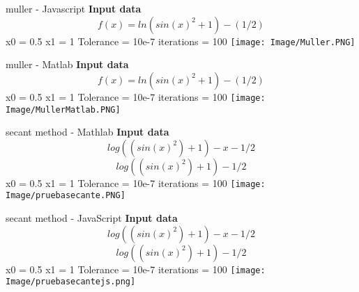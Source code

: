 \documentclass{article}
\begin{document}
\begin{section}{muller - Javascript}
   \textbf{Input data}\newline
   \[f(x)=ln(sin(x)^2+1)-(1/2)\]\newline
    x0 = 0.5\newline
    x1 = 1\newline
    Tolerance = 10e-7\newline
    iterations = 100 \newline\newline
    \texttt{[image: Image/Muller.PNG]}
\end{section}
\begin{section}{muller - Matlab}
   \textbf{Input data}\newline
    \[f(x)=ln(sin(x)^2+1)-(1/2)\]\newline
    x0 = 0.5\newline
    x1 = 1\newline
    Tolerance = 10e-7\newline
    iterations = 100 \newline\newline
    \texttt{[image: Image/MullerMatlab.PNG]}
\end{section}
\begin{section}{secant method - Mathlab}
   \textbf{Input data}\newline
    \[log((sin(x)^2)+1)-x-1/2\]\newline
    \[log((sin(x)^2)+1)-1/2\]\newline
    x0 = 0.5\newline
    x1 = 1\newline
    Tolerance = 10e-7\newline
    iterations = 100 \newline\newline
    \texttt{[image: Image/pruebasecante.PNG]}
\end{section}
\begin{section}{secant method - JavaScript}
   \textbf{Input data}\newline
    \[log((sin(x)^2)+1)-x-1/2\]\newline
    \[log((sin(x)^2)+1)-1/2\]\newline
    x0 = 0.5\newline
    x1 = 1\newline
    Tolerance = 10e-7\newline
    iterations = 100 \newline\newline
    \texttt{[image: Image/pruebasecantejs.png]}
\end{section}
\end{document}
